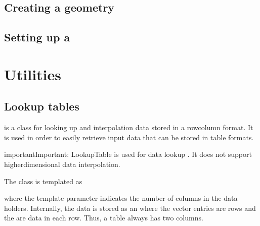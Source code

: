 \documentclass[letterpaper,10pt,english]{sphinxmanual}
\begin{document}
\section{Creating a geometry}
\label{\detokenize{Tutorials/Tutorial:creating-a-geometry}}

\section{Setting up a }
\label{\detokenize{Tutorials/Tutorial:setting-up-a-timestepper}}

\chapter{Utilities}
\label{\detokenize{index:utilities}}
\sphinxstepscope


\section{Lookup tables}
\label{\detokenize{Utilities/LookupTable:lookup-tables}}\label{\detokenize{Utilities/LookupTable:chap-lookuptable}}\label{\detokenize{Utilities/LookupTable::doc}}
\sphinxAtStartPar
{} is a class for looking up and interpolation data stored in a row\sphinxhyphen{}column format.
It is used in order to easily retrieve input data that can be stored in table formats.

\begin{sphinxadmonition}{important}{Important:}
\sphinxAtStartPar
LookupTable is used for data lookup .
It does not support higher\sphinxhyphen{}dimensional data interpolation.
\end{sphinxadmonition}

\sphinxAtStartPar
The class is templated as

\begin{sphinxVerbatim}[commandchars=\\\{\},formatcom=\scriptsize]
  
 
\end{sphinxVerbatim}

\sphinxAtStartPar
where the template parameter  indicates the number of columns in the data holders.
Internally, the data is stored as an  where the vector entries are rows and the  are data in each row.
Thus, a table  always has two columns.
\end{document}
